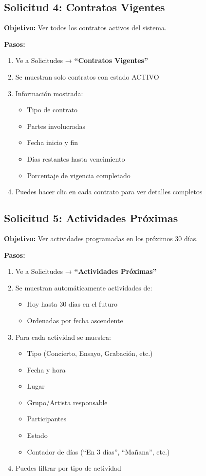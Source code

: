 \documentclass[12pt,a4paper,spanish,oneside]{report}
\begin{document}
\subsection{Solicitud 4: Contratos Vigentes}

\textbf{Objetivo:} Ver todos los contratos activos del sistema.

\textbf{Pasos:}
\begin{enumerate}
\item Ve a Solicitudes → \textbf{``Contratos Vigentes''}
\item Se muestran solo contratos con estado ACTIVO
\item Información mostrada:
\begin{itemize}
\item Tipo de contrato
\item Partes involucradas
\item Fecha inicio y fin
\item Días restantes hasta vencimiento
\item Porcentaje de vigencia completado
\end{itemize}
\item Puedes hacer clic en cada contrato para ver detalles completos
\end{enumerate}

\subsection{Solicitud 5: Actividades Próximas}

\textbf{Objetivo:} Ver actividades programadas en los próximos 30 días.

\textbf{Pasos:}
\begin{enumerate}
\item Ve a Solicitudes → \textbf{``Actividades Próximas''}
\item Se muestran automáticamente actividades de:
\begin{itemize}
\item Hoy hasta 30 días en el futuro
\item Ordenadas por fecha ascendente
\end{itemize}
\item Para cada actividad se muestra:
\begin{itemize}
\item Tipo (Concierto, Ensayo, Grabación, etc.)
\item Fecha y hora
\item Lugar
\item Grupo/Artista responsable
\item Participantes
\item Estado
\item Contador de días (``En 3 días'', ``Mañana'', etc.)
\end{itemize}
\item Puedes filtrar por tipo de actividad
\end{enumerate}
\end{document}
